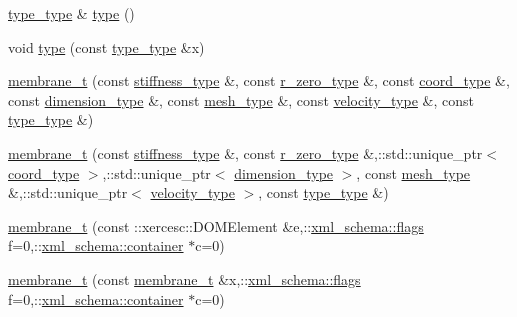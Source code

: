 \begin{DoxyCompactItemize}
\hyperlink{classmembrane__t_a13eb0ee51a5a6018151503690e28e2fb}{type\+\_\+type} \& \hyperlink{classmembrane__t_a3b77e8dc34f8b537c242ef10b4d3cf61}{type} ()
\item 
void \hyperlink{classmembrane__t_a29a71237a98bcfe60c1e851ab4e15b55}{type} (const \hyperlink{classmembrane__t_a13eb0ee51a5a6018151503690e28e2fb}{type\+\_\+type} \&x)
\item 
\hyperlink{classmembrane__t_a9c2ab017a39b33ae616845439d7c3ff5}{membrane\+\_\+t} (const \hyperlink{classmembrane__t_a9e55619d3d02a55660849deaa0ca4338}{stiffness\+\_\+type} \&, const \hyperlink{classmembrane__t_ab1e0c179101c4b2916059925d73468ff}{r\+\_\+zero\+\_\+type} \&, const \hyperlink{classmembrane__t_a0841f5bafc269d612a4b6fefcce1d73f}{coord\+\_\+type} \&, const \hyperlink{classmembrane__t_afdd0310501689ebab285ec39821c5b76}{dimension\+\_\+type} \&, const \hyperlink{classmembrane__t_a259dfb54e3d4a66cdd72b5b0831f4188}{mesh\+\_\+type} \&, const \hyperlink{classmembrane__t_a41bad26c4626a8ceac158b3817306c62}{velocity\+\_\+type} \&, const \hyperlink{classmembrane__t_a13eb0ee51a5a6018151503690e28e2fb}{type\+\_\+type} \&)
\item 
\hyperlink{classmembrane__t_a8f5dcc9b15d78f2fa80c1c83399c2d8a}{membrane\+\_\+t} (const \hyperlink{classmembrane__t_a9e55619d3d02a55660849deaa0ca4338}{stiffness\+\_\+type} \&, const \hyperlink{classmembrane__t_ab1e0c179101c4b2916059925d73468ff}{r\+\_\+zero\+\_\+type} \&,\+::std\+::unique\+\_\+ptr$<$ \hyperlink{classmembrane__t_a0841f5bafc269d612a4b6fefcce1d73f}{coord\+\_\+type} $>$,\+::std\+::unique\+\_\+ptr$<$ \hyperlink{classmembrane__t_afdd0310501689ebab285ec39821c5b76}{dimension\+\_\+type} $>$, const \hyperlink{classmembrane__t_a259dfb54e3d4a66cdd72b5b0831f4188}{mesh\+\_\+type} \&,\+::std\+::unique\+\_\+ptr$<$ \hyperlink{classmembrane__t_a41bad26c4626a8ceac158b3817306c62}{velocity\+\_\+type} $>$, const \hyperlink{classmembrane__t_a13eb0ee51a5a6018151503690e28e2fb}{type\+\_\+type} \&)
\item 
\hyperlink{classmembrane__t_a5af5a8814d8386b7b24464e3d9bb29e4}{membrane\+\_\+t} (const \+::xercesc\+::\+D\+O\+M\+Element \&e,\+::\hyperlink{namespacexml__schema_a0612287d030cb2732d31a45b258fdc87}{xml\+\_\+schema\+::flags} f=0,\+::\hyperlink{namespacexml__schema_ada9aa30dc722e93ee2ed7243085402a5}{xml\+\_\+schema\+::container} $\ast$c=0)
\item 
\hyperlink{classmembrane__t_abf44e0aac152377e8cc2624b7560bcda}{membrane\+\_\+t} (const \hyperlink{classmembrane__t}{membrane\+\_\+t} \&x,\+::\hyperlink{namespacexml__schema_a0612287d030cb2732d31a45b258fdc87}{xml\+\_\+schema\+::flags} f=0,\+::\hyperlink{namespacexml__schema_ada9aa30dc722e93ee2ed7243085402a5}{xml\+\_\+schema\+::container} $\ast$c=0)

\end{DoxyCompactItemize}
